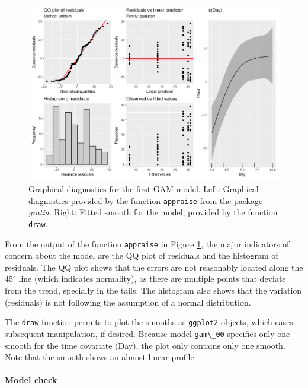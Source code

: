 \documentclass[
]{article}
\newcommand{\passthrough}[1]{#1}
\begin{document}
\begin{figure}[H]

{\centering \includegraphics[width=0.75\linewidth,]{00-Full_document_files/figure-latex/first-GAM-diag-1} 

}

\caption{Graphical diagnostics for the first GAM model. Left: Graphical diagnostics provided by the function \passthrough{\lstinline!appraise!} from the package \emph{gratia}. Right: Fitted smooth for the model, provided by the function \passthrough{\lstinline!draw!}.}\label{fig:first-GAM-diag}
\end{figure}

From the output of the function \passthrough{\lstinline!appraise!} in Figure \ref{fig:first-GAM-diag}, the major indicators of concern about the model are the QQ plot of residuals and the histogram of residuals. The QQ plot shows that the errors are not reasonably located along the 45\(^{\circ}\) line (which indicates normality), as there are multiple points that deviate from the trend, specially in the tails. The histogram also shows that the variation (residuals) is not following the assumption of a normal distribution.

The \passthrough{\lstinline!draw!} function permits to plot the smooths as \passthrough{\lstinline!ggplot2!} objects, which eases subsequent manipulation, if desired. Because model \passthrough{\lstinline!gam\_00!} specifies only one smooth for the time covariate (Day), the plot only contains only one smooth. Note that the smooth shows an almost linear profile.

\hypertarget{model-check}{%
\paragraph{Model check}\label{model-check}}
\end{document}
